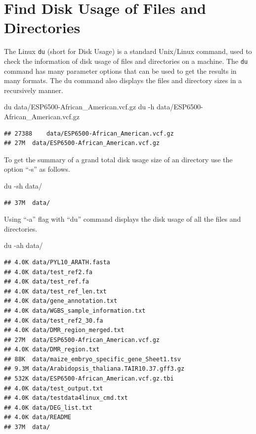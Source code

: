 \documentclass[]{book}
\makeatletter
\newenvironment{Shaded}{\begin{snugshade}}{\end{snugshade}}
\newcommand{\FunctionTok}[1]{\textcolor[rgb]{0.00,0.00,0.00}{#1}}
\newcommand{\NormalTok}[1]{#1}
\newenvironment{kframe}{%
\medskip{}
\setlength{\fboxsep}{.8em}
 \def\at@end@of@kframe{}%
 \ifinner\ifhmode%
  \def\at@end@of@kframe{\end{minipage}}%
  \begin{minipage}{\columnwidth}%
 \fi\fi%
 \def\FrameCommand##1{\hskip\@totalleftmargin \hskip-\fboxsep
 \colorbox{shadecolor}{##1}\hskip-\fboxsep
     \hskip-\linewidth \hskip-\@totalleftmargin \hskip\columnwidth}%
 \MakeFramed {\advance\hsize-\width
   \@totalleftmargin\z@ \linewidth\hsize
   \@setminipage}}%
 {\par\unskip\endMakeFramed%
 \at@end@of@kframe}
\renewenvironment{Shaded}{\begin{kframe}}{\end{kframe}}
\makeatother
\begin{document}
\hypertarget{find-disk-usage-of-files-and-directories}{%
\section{Find Disk Usage of Files and Directories}\label{find-disk-usage-of-files-and-directories}}

The Linux \texttt{du} (short for Disk Usage) is a standard Unix/Linux command, used to check the information of disk usage of files and directories on a machine. The \texttt{du} command has many parameter options that can be used to get the results in many formats. The du command also displays the files and directory sizes in a recursively manner.

\begin{Shaded}
\begin{Highlighting}[]
\FunctionTok{du}\NormalTok{ data/ESP6500-African_American.vcf.gz}
\FunctionTok{du}\NormalTok{ -h data/ESP6500-African_American.vcf.gz}
\end{Highlighting}
\end{Shaded}

\begin{verbatim}
## 27388    data/ESP6500-African_American.vcf.gz
## 27M  data/ESP6500-African_American.vcf.gz
\end{verbatim}

To get the summary of a grand total disk usage size of an directory use the option ``-s'' as follows.

\begin{Shaded}
\begin{Highlighting}[]
\FunctionTok{du}\NormalTok{ -sh data/}
\end{Highlighting}
\end{Shaded}

\begin{verbatim}
## 37M  data/
\end{verbatim}

Using ``-a'' flag with ``du'' command displays the disk usage of all the files and directories.

\begin{Shaded}
\begin{Highlighting}[]
\FunctionTok{du}\NormalTok{ -ah data/}
\end{Highlighting}
\end{Shaded}

\begin{verbatim}
## 4.0K data/PYL10_ARATH.fasta
## 4.0K data/test_ref2.fa
## 4.0K data/test_ref.fa
## 4.0K data/test_ref_len.txt
## 4.0K data/gene_annotation.txt
## 4.0K data/WGBS_sample_information.txt
## 4.0K data/test_ref2_30.fa
## 4.0K data/DMR_region_merged.txt
## 27M  data/ESP6500-African_American.vcf.gz
## 4.0K data/DMR_region.txt
## 88K  data/maize_embryo_specific_gene_Sheet1.tsv
## 9.3M data/Arabidopsis_thaliana.TAIR10.37.gff3.gz
## 532K data/ESP6500-African_American.vcf.gz.tbi
## 4.0K data/test_output.txt
## 4.0K data/testdata4linux_cmd.txt
## 4.0K data/DEG_list.txt
## 4.0K data/README
## 37M  data/
\end{verbatim}
\end{document}
